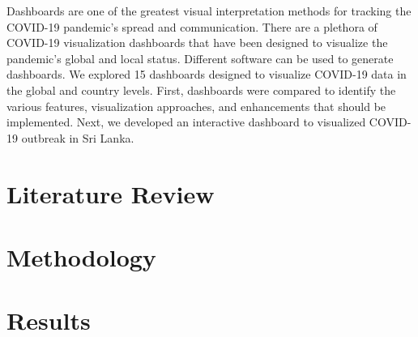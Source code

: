 \documentclass[]{interact}
\theoremstyle{plain}%
\theoremstyle{definition}
\theoremstyle{remark}
\begin{document}
Dashboards are one of the greatest visual interpretation methods for
tracking the COVID-19 pandemic's spread and communication. There are a
plethora of COVID-19 visualization dashboards that have been designed to
visualize the pandemic's global and local status. Different software can
be used to generate dashboards. We explored 15 dashboards designed to
visualize COVID-19 data in the global and country levels. First,
dashboards were compared to identify the various features, visualization
approaches, and enhancements that should be implemented. Next, we
developed an interactive dashboard to visualized COVID-19 outbreak in
Sri Lanka.

\hypertarget{literature-review}{%
\section{Literature Review}\label{literature-review}}

\hypertarget{methodology}{%
\section{Methodology}\label{methodology}}

\hypertarget{results}{%
\section{Results}\label{results}}






\end{document}
